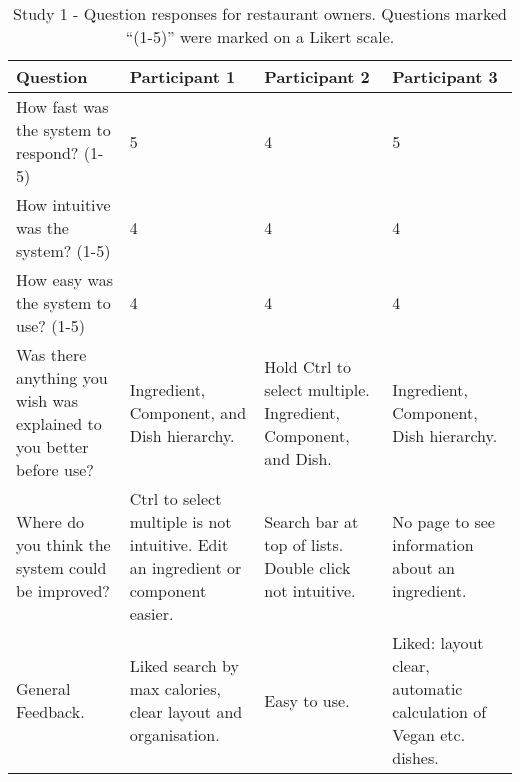 \begin{table}[h]
    \centering
    \begin{tabular}{ |p{}|p{}|p{}|p{}| }
    \hline
    \textbf{Question} & \textbf{Participant 1} & \textbf{Participant 2} & \textbf{Participant 3} \\
    \hline
    How fast was the system to respond? (1-5) & 5 & 4 & 5 \\
    \hline
    How intuitive was the system? (1-5) & 4 & 4 & 4 \\
    \hline
    How easy was the system to use? (1-5) & 4 & 4 & 4 \\
    \hline
    Was there anything you wish was explained to you better before use? & Ingredient, Component, and Dish hierarchy. & Hold Ctrl to select multiple. Ingredient, Component, and Dish.  & Ingredient, Component, Dish hierarchy. \\
    \hline
    Where do you think the system could be improved? & Ctrl to select multiple is not intuitive. Edit an ingredient or component easier. & Search bar at top of lists. Double click not intuitive. & No page to see information about an ingredient. \\
    \hline
    General Feedback. & Liked search by max calories, clear layout and organisation. & Easy to use. & Liked: layout clear, automatic calculation of Vegan etc. dishes. \\
    \hline
    \end{tabular}
    \captionsetup{justification=centering}
    \caption[Study 1 - Question responses from restaurant owners]{Study 1 - Question responses for restaurant owners. Questions marked ``(1-5)'' were marked on a Likert scale.}
    \label{tab:Study1AnswersRO}
\end{table}

